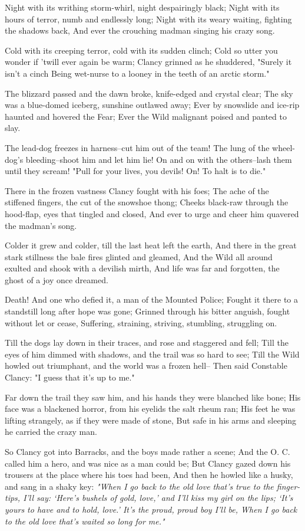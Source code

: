 \begin{poemblock}
 Night with its writhing storm-whirl, night despairingly black;
  Night with its hours of terror, numb and endlessly long;
 Night with its weary waiting, fighting the shadows back,
  And ever the crouching madman singing his crazy song.

 Cold with its creeping terror, cold with its sudden clinch;
  Cold so utter you wonder if 'twill ever again be warm;
 Clancy grinned as he shuddered, "Surely it isn't a cinch
  Being wet-nurse to a looney in the teeth of an arctic storm."

 The blizzard passed and the dawn broke, knife-edged and crystal clear;
  The sky was a blue-domed iceberg, sunshine outlawed away;
 Ever by snowslide and ice-rip haunted and hovered the Fear;
  Ever the Wild malignant poised and panted to slay.

 The lead-dog freezes in harness--cut him out of the team!
  The lung of the wheel-dog's bleeding--shoot him and let him lie!
 On and on with the others--lash them until they scream!
  "Pull for your lives, you devils!  On!  To halt is to die."

 There in the frozen vastness Clancy fought with his foes;
  The ache of the stiffened fingers, the cut of the snowshoe thong;
 Cheeks black-raw through the hood-flap, eyes that tingled and closed,
  And ever to urge and cheer him quavered the madman's song.

 Colder it grew and colder, till the last heat left the earth,
  And there in the great stark stillness the bale fires glinted and gleamed,
 And the Wild all around exulted and shook with a devilish mirth,
  And life was far and forgotten, the ghost of a joy once dreamed.

 Death!  And one who defied it, a man of the Mounted Police;
  Fought it there to a standstill long after hope was gone;
 Grinned through his bitter anguish, fought without let or cease,
  Suffering, straining, striving, stumbling, struggling on.

 Till the dogs lay down in their traces, and rose and staggered and fell;
  Till the eyes of him dimmed with shadows,
and the trail was so hard to see;
 Till the Wild howled out triumphant, and the world was a frozen hell--
  Then said Constable Clancy:  "I guess that it's up to me."

 Far down the trail they saw him,
   and his hands they were blanched like bone;
  His face was a blackened horror, from his eyelids the salt rheum ran;
 His feet he was lifting strangely, as if they were made of stone,
  But safe in his arms and sleeping he carried the crazy man.

 So Clancy got into Barracks, and the boys made rather a scene;
  And the O. C. called him a hero, and was nice as a man could be;
 But Clancy gazed down his trousers at the place where his toes had been,
  And then he howled like a husky, and sang in a shaky key:
\textit{
  "When I go back to the old love that's true to the finger-tips,
  I'll say:  `Here's bushels of gold, love,'
and I'll kiss my girl on the lips;
  `It's yours to have and to hold, love.'
It's the proud, proud boy I'll be,
  When I go back to the old love that's waited so long for me."
}

\end{poemblock}
